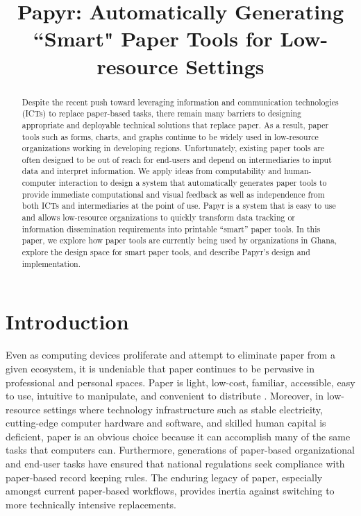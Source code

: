 \documentclass{sig-alternate}
\begin{document}
\newcommand{\nifty}{\textsf{Papyr}\xspace}

\title{Papyr: Automatically Generating ``Smart" Paper Tools for Low-resource Settings}
\author{}
\maketitle

\begin{abstract}

Despite the recent push toward leveraging information and communication technologies (ICTs) to replace paper-based tasks, there remain many barriers to designing appropriate and deployable technical solutions that replace paper.
As a result, paper tools such as forms, charts, and graphs continue to be widely used in low-resource organizations working in developing regions.
Unfortunately, existing paper tools are often designed to be out of reach for end-users and depend on intermediaries to input data and interpret information. 
We apply ideas from computability and human-computer interaction to design a system that automatically generates paper tools to provide immediate computational and visual feedback as well as independence from both ICTs and intermediaries at the point of use. 
\nifty is a system that is easy to use and allows low-resource organizations to quickly transform data tracking or information dissemination requirements into printable ``smart'' paper tools. 
In this paper, we explore how paper tools are currently being used by organizations in Ghana, explore the design space for smart paper tools, and describe \nifty's design and implementation.

\end{abstract}



\section{Introduction}

Even as computing devices proliferate and attempt to eliminate paper from a given ecosystem, it is undeniable that paper continues to be pervasive in professional and personal spaces.
Paper is light, low-cost, familiar, accessible, easy to use, intuitive to manipulate, and convenient to distribute \cite{sellen1997,sellen2002,johnson1993}. Moreover, in low-resource settings where technology infrastructure such as stable electricity, cutting-edge computer hardware and software, and skilled human capital is deficient, paper is an obvious choice because it can accomplish many of the same tasks that computers can. Furthermore, generations of paper-based organizational and end-user tasks have ensured that national regulations seek compliance with paper-based record keeping rules. The enduring legacy of paper, especially amongst current paper-based workflows, provides inertia against switching to more technically intensive replacements. 
\end{document}
